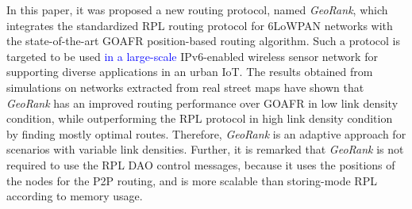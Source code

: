 \documentclass[final,authoryear,3p,twocolumn]{elsarticle}
\newcommand{\removed}[1]{}
\newcommand{\rev}{\textcolor{blue}}
\begin{document}
In this paper, it was proposed a new routing protocol, named \textit{GeoRank}, which integrates the standardized RPL routing protocol for 6LoWPAN networks with the state-of-the-art GOAFR position-based routing algorithm. 
Such a protocol is targeted to be used \removed{in a smart street lighting system based on}\rev{in a large-scale} IPv6-enabled wireless sensor network for supporting diverse applications in an urban IoT. The results obtained from simulations on networks extracted from real street maps have shown that \textit{GeoRank} has an improved routing performance over GOAFR in low link density condition, while outperforming the RPL protocol in high link density condition by finding mostly optimal routes. Therefore, \textit{GeoRank} is an adaptive approach for scenarios with variable link densities. Further, it is remarked that \textit{GeoRank} is not required to use the RPL DAO control messages, because it uses the positions of the nodes for the P2P routing, and is more scalable than storing-mode RPL according to memory usage. 
	
%


\end{document}
